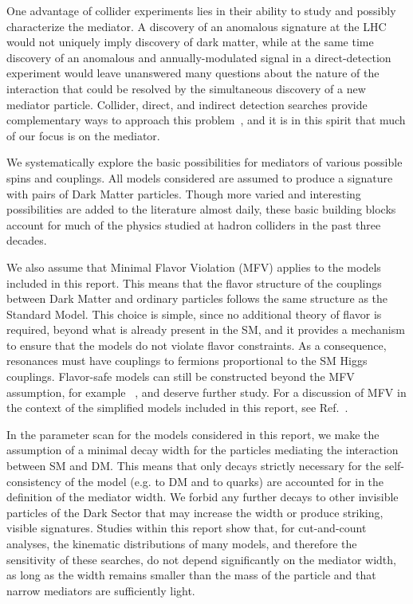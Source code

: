 One advantage of collider experiments lies in their ability to study
and possibly characterize the mediator. A discovery of an anomalous
\MET signature at the LHC would not uniquely imply discovery of dark
matter, while at the same time discovery of an anomalous and
annually-modulated signal in a direct-detection experiment would leave
unanswered many questions about the nature of the interaction that
could be resolved by the simultaneous discovery of a new mediator
particle. Collider, direct, and indirect detection searches provide
complementary ways to approach this problem~\cite{Bauer:2013ihz}, and it is in this spirit
that much of our focus is on the mediator.

We systematically explore the basic possibilities for
mediators of various possible spins and couplings.
All models considered are assumed to produce a signature with pairs of Dark Matter particles.
Though more varied and
interesting possibilities are added to the literature almost daily,
these basic building blocks account for much of the physics studied at
hadron colliders in the past three decades.

We also assume that Minimal Flavor Violation (MFV) \cite{Chivukula:1987py,Hall:1990ac,Buras:2000dm,D'Ambrosio:2002ex} applies to the
models included in this report. This means that the flavor structure of the
couplings between Dark Matter and ordinary particles follows the same
structure as the Standard Model. This choice is simple, since no
additional theory of flavor is required, beyond what is already
present in the SM, and it provides a mechanism to ensure that the
models do not violate flavor constraints.  As a consequence, \spinzero
resonances must have couplings to fermions proportional to the SM Higgs couplings. 
Flavor-safe models can still be constructed beyond the MFV
assumption, for example ~\cite{Agrawal:2014aoa}, and deserve further study.
For a discussion of MFV in the context of the simplified models
included in this report, see Ref.~\cite{DMatLHCProceedings}.

In the parameter scan for the models considered in this report, we make the
assumption of a minimal decay width for the particles mediating the
interaction between SM and DM.  This means that only decays
strictly necessary for the self-consistency of the model (e.g.  to DM
and to quarks) are accounted for in the definition of the mediator
width. We forbid any further decays to other invisible particles of
the Dark Sector that may increase the width or produce striking, visible signatures. 
Studies within this report show that, for cut-and-count analyses, the kinematic distributions of
many models, and therefore the sensitivity of these searches, do not depend
significantly on the mediator width, as long as the width remains smaller
than the mass of the particle and that narrow mediators are sufficiently light.


